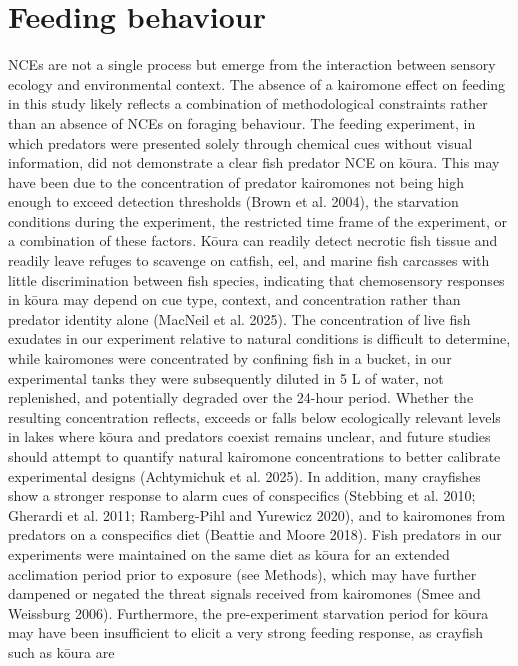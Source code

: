 \documentclass[
  12pt,
  a4paper,
]{scrbook}
\begin{document}
\section{Feeding behaviour}\label{feeding-behaviour}

NCEs are not a single process but emerge from the interaction between
sensory ecology and environmental context. The absence of a kairomone
effect on feeding in this study likely reflects a combination of
methodological constraints rather than an absence of NCEs on foraging
behaviour. The feeding experiment, in which predators were presented
solely through chemical cues without visual information, did not
demonstrate a clear fish predator NCE on kōura. This may have been due
to the concentration of predator kairomones not being high enough to
exceed detection thresholds (Brown et al. 2004), the starvation
conditions during the experiment, the restricted time frame of the
experiment, or a combination of these factors. Kōura can readily detect
necrotic fish tissue and readily leave refuges to scavenge on catfish,
eel, and marine fish carcasses with little discrimination between fish
species, indicating that chemosensory responses in kōura may depend on
cue type, context, and concentration rather than predator identity alone
(MacNeil et al. 2025). The concentration of live fish exudates in our
experiment relative to natural conditions is difficult to determine,
while kairomones were concentrated by confining fish in a bucket, in our
experimental tanks they were subsequently diluted in 5 L of water, not
replenished, and potentially degraded over the 24-hour period. Whether
the resulting concentration reflects, exceeds or falls below
ecologically relevant levels in lakes where kōura and predators coexist
remains unclear, and future studies should attempt to quantify natural
kairomone concentrations to better calibrate experimental designs
(Achtymichuk et al. 2025). In addition, many crayfishes show a stronger
response to alarm cues of conspecifics (Stebbing et al. 2010; Gherardi
et al. 2011; Ramberg-Pihl and Yurewicz 2020), and to kairomones from
predators on a conspecifics diet (Beattie and Moore 2018). Fish
predators in our experiments were maintained on the same diet as kōura
for an extended acclimation period prior to exposure (see Methods),
which may have further dampened or negated the threat signals received
from kairomones (Smee and Weissburg 2006). Furthermore, the
pre-experiment starvation period for kōura may have been insufficient to
elicit a very strong feeding response, as crayfish such as kōura are
\end{document}
